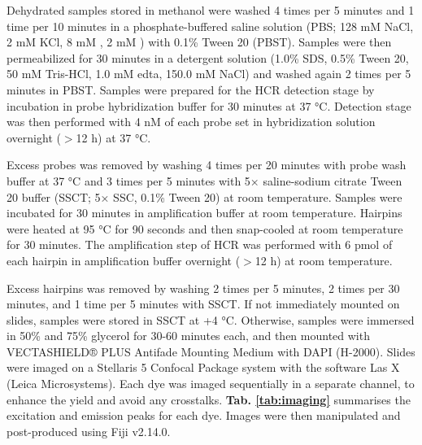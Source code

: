Dehydrated samples stored in methanol were washed 4 times per 5 minutes and 1 time per 10 minutes in a phosphate-buffered saline solution (PBS; 128 mM NaCl, 2 mM KCl, 8 mM , 2 mM ) with 0.1\% Tween 20 (PBST). Samples were then permeabilized for 30 minutes in a detergent solution (1.0\% SDS, 0.5\% Tween 20, 50 mM Tris-HCl, 1.0 mM \gls{edta}, 150.0 mM NaCl) and washed again 2 times per 5 minutes in PBST. Samples were prepared for the HCR detection stage by incubation in probe hybridization buffer for 30 minutes at 37 °C. Detection stage was then performed with 4 nM of each probe set in hybridization solution overnight ($>$12 h) at 37 °C.

Excess probes was removed by washing 4 times per 20 minutes with probe wash buffer at 37 °C and 3 times per 5 minutes with 5× saline-sodium citrate Tween 20 buffer (SSCT; 5× SSC, 0.1\% Tween 20) at room temperature. Samples were incubated for 30 minutes in amplification buffer at room temperature. Hairpins were heated at 95 °C for 90 seconds and then snap-cooled at room temperature for 30 minutes. The amplification step of HCR was performed with 6 pmol of each hairpin in amplification buffer overnight ($>$12 h) at room temperature.

Excess hairpins was removed by washing 2 times per 5 minutes, 2 times per 30 minutes, and 1 time per 5 minutes with SSCT. If not immediately mounted on slides, samples were stored in SSCT at +4 °C. Otherwise, samples were immersed in 50\% and 75\% glycerol for 30-60 minutes each, and then mounted with VECTASHIELD® PLUS Antifade Mounting Medium with DAPI (H-2000). Slides were imaged on a Stellaris 5 Confocal Package system with the software Las X (Leica Microsystems). Each dye was imaged sequentially in a separate channel, to enhance the yield and avoid any crosstalks. \textbf{Tab. \ref{tab:imaging}} summarises the excitation and emission peaks for each dye. Images were then manipulated and post-produced using Fiji v2.14.0.

